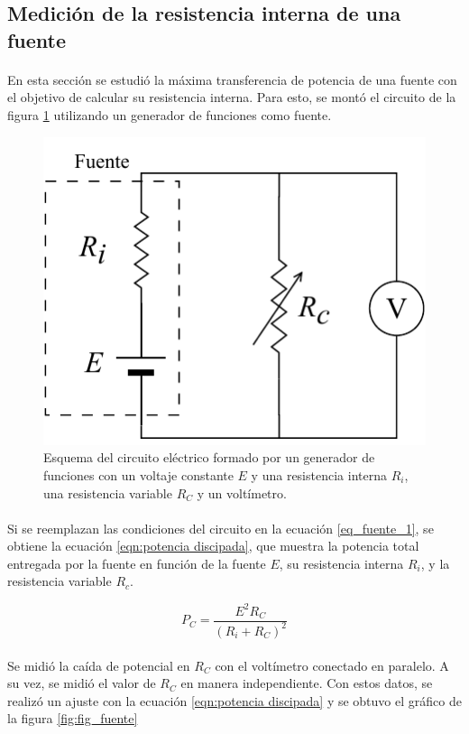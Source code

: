 \subsection{Medición de la resistencia interna de una fuente} \label{sec:resistencia de fuente}

\paragraph{}
En esta sección se estudió la máxima transferencia de potencia de una fuente con el objetivo de calcular su resistencia interna. Para esto, se montó el circuito de la figura \ref{fig:esq_fuente} utilizando un generador de funciones como fuente.

\begin{figure}[H]
    \centering
    \includegraphics[width = 0.4\linewidth]{Esquemas/Resistencia fuente.pdf}
    \caption{Esquema del circuito eléctrico formado por un generador de funciones con un voltaje constante $E$ y una resistencia interna $R_i$, una resistencia variable $R_C$ y un voltímetro.}
    \label{fig:esq_fuente}
\end{figure}

\paragraph{}
Si se reemplazan las condiciones del circuito en la ecuación \ref{eq_fuente_1}, se obtiene la ecuación \ref{eqn:potencia discipada}, que muestra la potencia total entregada por la fuente en función de la fuente $E$, su resistencia interna $R_i$, y la resistencia variable $R_c$.

\begin{equation}\label{eqn:potencia discipada}
    P_C = \frac{E^2 R_C}{(R_i + R_C)^2}
\end{equation}

\paragraph{}
Se midió la caída de potencial en $R_C$ con el voltímetro conectado en paralelo. A su vez, se midió el valor de $R_C$ en manera independiente. Con estos datos, se realizó un ajuste con la ecuación \ref{eqn:potencia discipada} y se obtuvo el gráfico de la figura \ref{fig:fig_fuente}

